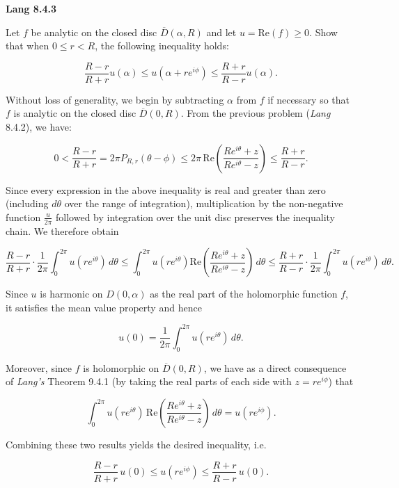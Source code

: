 \textbf{Lang 8.4.3}

Let $f$ be analytic on the closed disc $\overline{D}(\alpha, R)$ and let $u = \text{Re}(f) \ge 0$. Show that when 
$0 \le r < R$, the following inequality holds:

$$
\frac{R - r}{R + r} u(\alpha) \le u(\alpha + r e^{i \phi}) \le \frac{R + r}{R - r} u(\alpha).
$$

\begin{solution}
  Without loss of generality, we begin by subtracting $\alpha$ from $f$ if necessary so that $f$ is analytic on the 
  closed disc $\overline{D}(0, R)$. From the previous problem (\textit{Lang} 8.4.2), we have:

  $$
  0 < \frac{R - r}{R + r} 
    = 2 \pi P_{R, r}(\theta - \phi)
    \le 2 \pi \, \text{Re} \left(\frac{R e^{i\theta} + z}{{R e^{i\theta} - z}}\right)
    \le \frac{R + r}{R - r}.
  $$

  Since every expression in the above inequality is real and greater than zero (including $d \theta$ over the range of
  integration), multiplication by the non-negative function $\frac{u}{2 \pi}$ followed by integration over the unit disc 
  preserves the inequality chain. We therefore obtain

  $$
  \frac{R - r}{R + r} \cdot \frac{1}{2 \pi} \int_0^{2 \pi} u(r e^{i \theta}) \, d\theta 
    \le \int_0^{2 \pi} u(r e^{i \theta}) \text{Re} \left(\frac{R e^{i\theta} + z}{{R e^{i\theta} - z}}\right) \, d\theta
    \le \frac{R + r}{R - r} \cdot \frac{1}{2 \pi} \int_0^{2 \pi} u(r e^{i \theta}) \, d\theta.
  $$

  Since $u$ is harmonic on $D(0, \alpha)$ as the real part of the holomorphic function $f$, it satisfies the mean value 
  property and hence

  $$
  u(0) = \frac{1}{2 \pi} \int_0^{2 \pi} u(r e^{i \theta}) \, d\theta.
  $$

  Moreover, since $f$ is holomorphic on $\overline{D}(0, R)$, we have as a direct consequence of \textit{Lang's} 
  Theorem 9.4.1 (by taking the real parts of each side with $z = r e^{i \phi}$) that

  $$
  \int_0^{2 \pi} u(r e^{i \theta}) \, \text{Re} \left(\frac{R e^{i\theta} + z}{{R e^{i\theta} - z}}\right) \, d\theta
    = u(r e^{i \phi}).
  $$

  Combining these two results yields the desired inequality, i.e.

  $$
  \frac{R - r}{R + r} \, u(0) \le u(r e^{i \phi}) \le \frac{R + r}{R - r} \, u(0).
  $$
  \ \\
\end{solution}
